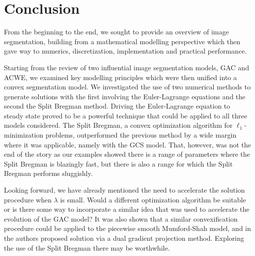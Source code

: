 \chapter{Conclusion}
\label{ch:con}

From the beginning to the end, we sought to provide an overview of image segmentation, building from a mathematical modelling perspective which then gave way to numerics, discretization, implementation and practical performance. 

Starting from the review of two influential image segmentation models, GAC and ACWE, we examined key modelling principles which were then unified into a convex segmentation model. We investigated the use of two numerical methods to generate solutions with the first involving the Euler-Lagrange equations and the second the Split Bregman method. Driving the Euler-Lagrange equation to steady state proved to be a powerful technique that could be applied to all three models considered. The Split Bregman, a convex optimization algorithm for $\ell_1$-minimization problems, outperformed the previous method by a wide margin where it was applicable, namely with the GCS model. That, however, was not the end of the story as our examples showed there is a range of parameters where the Split Bregman is blazingly fast, but there is also a range for which the Split Bregman performs sluggishly.

Looking forward, we have already mentioned the need to accelerate the solution procedure when $\lambda$ is small. Would a different optimization algorithm be suitable or is there some way to incorporate a similar idea that was used to accelerate the evolution of the GAC model? It was also shown that a similar convexification procedure could be applied to the piecewise smooth Mumford-Shah model, and in \cite{bresson2007fast} the authors proposed solution via a dual gradient projection method. Exploring the use of the Split Bregman there may be worthwhile.
